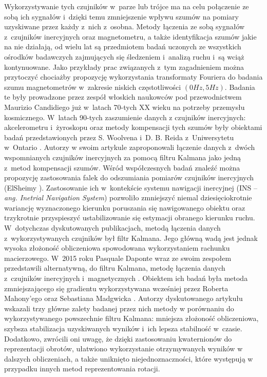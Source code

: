 Wykorzystywanie tych czujników w~parze lub trójce ma na celu połączenie ze sobą ich sygnałów i~dzięki temu zmniejszenie wpływu szumów na pomiary uzyskiwane przez każdy z~nich z~osobna. Metody łączenia ze sobą sygnałów z~czujników inercyjnych oraz magnetometru, a także identyfikacja szumów jakie na nie działają, od wielu lat są przedmiotem badań uczonych ze wszystkich ośrodków badawczych zajmujących się śledzeniem i~analizą ruchu i~są wciąż kontynuowane. Jako przykłady prac związanych z~tym zagadnieniem można przytoczyć chociażby propozycję wykorzystania transformaty Fouriera do badania szumu magnetometrów w~zakresie niskich częstotliwości $(0Hz, 5Hz)$\cite{Candidi1974}. Badania te były prowadzone przez zespół włoskich naukowców pod przewodnictwem Maurizio Candidiego już w~latach 70-tych XX wieku na potrzeby przemysłu kosmicznego. W~latach 90-tych zaszumienie danych z czujników inercyjnych: akcelerometru i~żyroskopu oraz metody kompensacji tych szumów były obiektami badań przedstawionych przez S. Woolvena i~D. B. Reida z~Uniwersytetu w~Ontario \cite{Woolven1994}. Autorzy w swoim artykule zaproponowali łączenie danych z~dwóch wspomnianych czujników inercyjnych za pomocą filtru Kalmana jako jedną z~metod kompensacji szumów. Wśród współczesnych badań znaleźć można propozycję zastosowania falek do odszumiania pomiarów czujników inercyjnych (ElSheimy \cite{ElSheimy2004}). Zastosowanie ich w~kontekście systemu nawigacji inercyjnej (INS -- \emph{ang. Inetrial Navigation System}) pozwoliło zmniejszyć niemal dziesięciokrotnie wariancję wyznaczonego kierunku poruszania się nawigowanego obiektu oraz trzykrotnie przyspieszyć ustabilizowanie się estymacji obranego kierunku ruchu. W~dotychczas dyskutowanych publikacjach, metodą łączenia danych z~wykorzystywanych czujników był filtr Kalmana. Jego główną wadą jest jednak wysoka złożoność obliczeniowa spowodowana wykorzystaniem rachunku macierzowego. W~2015 roku Pasquale Daponte wraz ze swoim zespołem przedstawili alternatywną, do filtru Kalmana, metodę łączenia danych z~czujników inercyjnych i~magnetycznych \cite{Daponte2015}. Obiektem ich badań była metoda zmniejszającego się gradientu wykorzystywana wcześniej przez Roberta Mahony'ego \cite{Mahony2005a} oraz Sebastiana Madgwicka \cite{Madgwick2011}. Autorzy dyskutowanego artykułu wskazali trzy główne zalety badanej przez nich metody w porównaniu do wykorzystywanego powszechnie filtru Kalmana: mniejsza złożoność obliczeniowa, szybsza stabilizacja uzyskiwanych wyników i~ich lepsza stabilność w~czasie. Dodatkowo, zwrócili oni uwagę, że dzięki zastosowaniu kwaternionów do reprezentacji obrotów, ułatwiono wykorzystanie otrzymywanych wyników w dalszych obliczeniach, a także uniknięto niejednoznaczności, które występują w przypadku innych metod reprezentowania rotacji.

